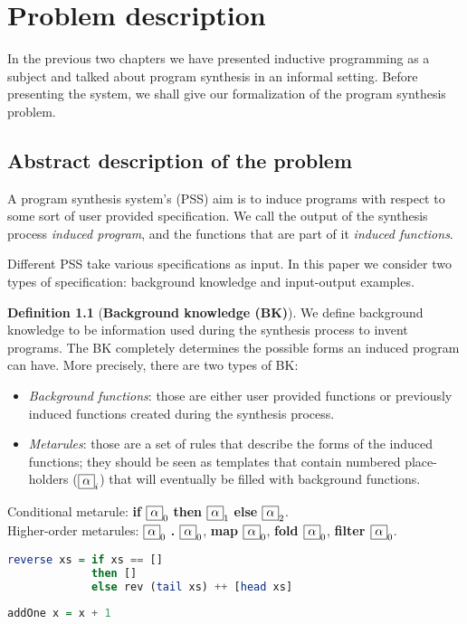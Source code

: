 \chapter{Problem description}
\indent \indent In the previous two chapters we have presented inductive programming as a subject and talked about program synthesis in an informal setting. Before presenting the system, we shall give our formalization of the program synthesis problem.

\section{Abstract description of the problem}
\theoremstyle{definition}
\newtheorem{defn}{Definition}

\theoremstyle{plain}
\newtheorem{claim}{Claim}
\newtheorem{thm}{Theorem}	

\indent \indent A program synthesis system's (PSS) aim is to induce programs with respect to some sort of user provided specification. We call the output of the synthesis process \textit{induced program}, and the functions that are part of it \textit{induced functions}.
\par Different PSS take various specifications as input. In this paper we consider two types of specification: background knowledge and input-output examples.

\begin{defn}[\textbf{Background knowledge (BK)}]
We define background knowledge to be information used during the synthesis process to invent programs. The BK completely determines the possible forms an induced program can have. More precisely, there are two types of BK:
\begin{itemize}
	\item \textit{Background functions}: those are either user provided functions or previously induced functions created during the synthesis process.
	\item \textit{Metarules}: those are a set of rules that describe the forms of the induced functions;  they should be seen as templates that contain numbered place-holders ($ \fbox{$\alpha$}_{i} $) that will eventually be filled with background functions. 
\end{itemize}
\end{defn}
\begin{exam}[Metarules]
\indent \indent Conditional metarule: \textbf{if} $\fbox{$\alpha$}_{0}$ \textbf{then} $\fbox{$\alpha$}_{1}$ \textbf{else} $\fbox{$\alpha$}_{2}$. \\
\indent Higher-order metarules: $\fbox{$\alpha$}_{0}$ \textbf{.} $\fbox{$\alpha$}_{0}$, \textbf{map $\fbox{$\alpha$}_{0}$}, \textbf{fold $\fbox{$\alpha$}_{0}$}, \textbf{filter $\fbox{$\alpha$}_{0}$}.
\end{exam}
\begin{exam}
\begin{lstlisting}[language=Haskell]
reverse xs = if xs == [] 
             then [] 
             else rev (tail xs) ++ [head xs]
         
addOne x = x + 1
\end{lstlisting}
\end{exam}

